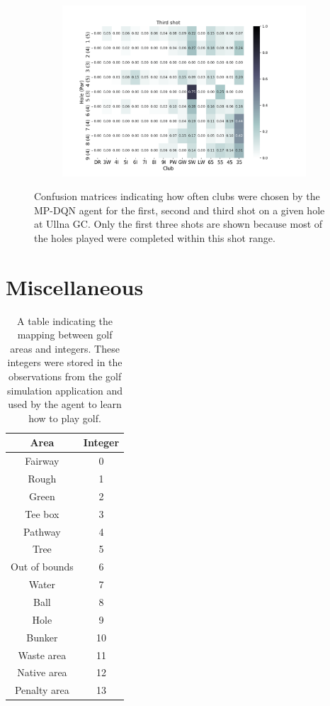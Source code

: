 \documentclass{kththesis}
\begin{document}
\begin{figure}
\begin{subfigure}{\textwidth}
    \includegraphics[height=0.3\textheight]{AgentClubChoices/MPDQN_Ullna_Club_Choices_Third_Shot.png} 
    \end{subfigure}
    \caption{Confusion matrices indicating how often clubs were chosen by the MP-DQN agent for the first, second and third shot on a given hole at Ullna GC. Only the first three shots are shown because most of the holes played were completed within this shot range.}
    \label{fig:MPDQN_ullna_club_choice_confusion}
\end{figure}

\chapter{Miscellaneous}
\begin{table}
    \centering
    \begin{tabular}{|c|c|}
        \hline
        \textbf{Area} & \textbf{Integer} \\ \hline
        Fairway & 0 \\ \hline
        Rough & 1 \\ \hline
        Green & 2 \\ \hline
        Tee box & 3 \\ \hline
        Pathway & 4 \\ \hline
        Tree & 5 \\ \hline
        Out of bounds & 6 \\ \hline
        Water & 7 \\ \hline
        Ball & 8 \\ \hline
        Hole & 9 \\ \hline
        Bunker & 10 \\ \hline
        Waste area & 11 \\ \hline
        Native area & 12 \\ \hline
        Penalty area & 13 \\ \hline
    \end{tabular}
    \caption{A table indicating the mapping between golf areas and integers. These integers were stored in the observations from the golf simulation application and used by the agent to learn how to play golf.}
    \label{app:tab:areamapping}
\end{table}

\tailmatter
\end{document}
